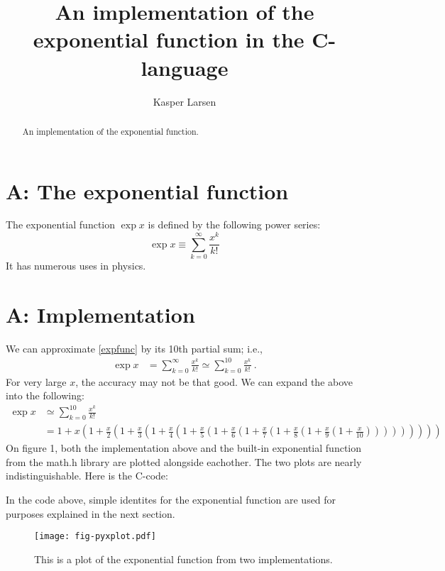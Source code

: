 \documentclass[onecolumn]{article}
\title{An implementation of the exponential function in the C-language}
\author{Kasper Larsen}
\date{}
\begin{document}
	\maketitle
	
	\begin{abstract}
		An implementation of the exponential function.
	\end{abstract}
	
	\section{A: The exponential function}
	
	The exponential function $\exp x$ is defined by the following power series: \begin{equation}
		\exp x \equiv \sum_{k=0}^{\infty}\frac{x^k}{k!} \label{expfunc}
	\end{equation}
	It has numerous uses in physics. 
	
	\section{A: Implementation}
	
	We can approximate \eqref{expfunc} by its 10th partial sum; i.e., \begin{align*}
	\exp x &= \sum_{k=0}^{\infty}\frac{x^k}{k!}\simeq \sum_{k=0}^{10}\frac{x^k}{k!}\:. \end{align*}
	For very large $x$, the accuracy may not be that good. We can expand the above into the following: \begin{align}
		\exp x&\simeq\sum_{k=0}^{10}\frac{x^k}{k!}\\
		&=1+x\left( 1+\frac{x}{2}\left( 1+\frac{x}{3} \left( 1+\frac{x}{4}\left( 1+\frac{x}{5}\left( 1+\frac{x}{6}\left( 1+\frac{x}{7}\left( 1+\frac{x}{8}\left( 1+\frac{x}{9}\left( 1+\frac{x}{10}\right) \right) \right) \right) \right) \right) \right) \right) \right)\nonumber 
	\end{align}
	On figure 1, both the implementation above and the built-in exponential function from the math.h library are plotted alongside eachother. 
	The two plots are nearly indistinguishable. Here is the C-code:
	
	
	In the code above, simple identites for the exponential function are used for purposes explained in the next section.
		 
	\begin{figure}[h]
		\center
		\texttt{[image: fig-pyxplot.pdf]}
		\caption{This is a plot of the exponential function from two implementations.}
	\end{figure}
\end{document}
